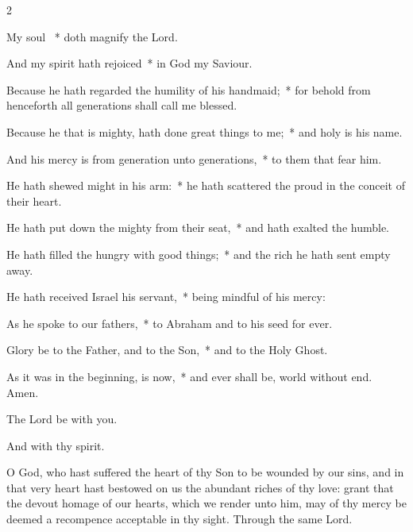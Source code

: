 \documentclass[12pt]{book}
\begin{document}

\begin{multicols}{2}
 \begin{enpars}
My soul \cc~* doth magnify the Lord.

And my spirit hath rejoiced~* in God my Saviour.

Because he hath regarded the humility of his handmaid;~* for behold from henceforth all generations shall call me blessed.

Because he that is mighty, hath done great things to me;~* and holy is his name.

And his mercy is from generation unto generations,~* to them that fear him.

He hath shewed might in his arm:~* he hath scattered the proud in the conceit of their heart.

He hath put down the mighty from their seat,~* and hath exalted the humble.

He hath filled the hungry with good things;~* and the rich he hath sent empty away.

He hath received Israel his servant,~* being mindful of his mercy:

As he spoke to our fathers,~* to Abraham and to his seed for ever.

Glory be to the Father, and to the Son,~* and to the Holy Ghost.

As it was in the beginning, is now,~* and ever shall be, world without end. Amen.
\end{enpars}
\end{multicols}


\label{oratio_sc}

{\noindent \vv The Lord be with you.

\noindent \rr And with thy spirit.

\noindent O God, who hast suffered the heart of thy Son to be wounded by our sins, and in that very heart hast bestowed on us the abundant riches of thy love: grant that the devout homage of our hearts, which we render unto him, may of thy mercy be deemed a recompence acceptable in thy sight.
Through the same Lord.}
\end{document}
